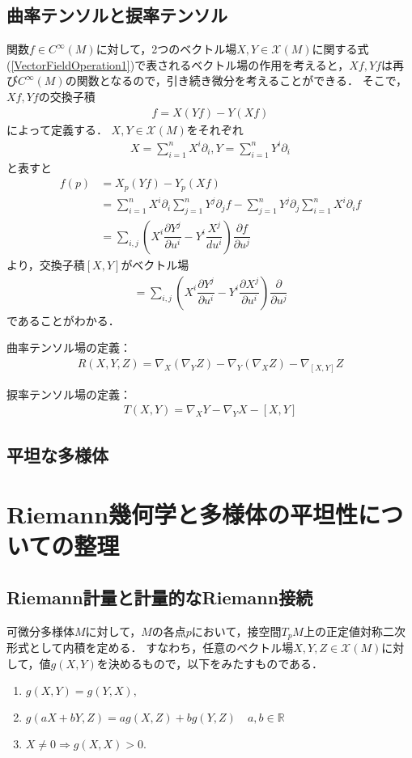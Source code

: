 \documentclass[dvipdfmx, a4paper,10pt]{jsarticle}
\theoremstyle{definition}
\newcommand{\eq}[1]{\begin{align}#1\end{align}}
\newcommand{\enums}[1]{\begin{enumerate}#1\end{enumerate}}
\begin{document}

\subsection{曲率テンソルと捩率テンソル}
関数$f\in C^\infty(M)$に対して，2つのベクトル場$X,Y\in\mathscr{X}(M)$に関する式(\ref{VectorFieldOperation1})で表されるベクトル場の作用を考えると，$Xf,Yf$は再び$C^\infty(M)$の関数となるので，引き続き微分を考えることができる．
そこで，$Xf,Yf$の交換子積
\eq{[X,Y]f=X(Yf)-Y(Xf)}
によって定義する．
$X,Y\in\mathscr{X}(M)$をそれぞれ
\eq{X=\sum_{i=1}^nX^i\partial_i,Y=\sum_{i=1}^nY^i\partial_i}
と表すと
\eq{
	[X,Y]f(p)
		&=X_p(Yf)-Y_p(Xf)\\
		&=\sum_{i=1}^nX^i\partial_i\sum_{j=1}^nY^j\partial_jf-\sum_{j=1}^nY^j\partial_j\sum_{i=1}^nX^i\partial_if\\
		&=\sum_{i,j}\left(X^i\dfrac{\partial Y^j}{\partial u^i}-Y^i\dfrac{X^j}{du^i}\right)\dfrac{\partial f}{\partial u^j}
}
より，交換子積$[X,Y]$がベクトル場
\eq{[X,Y]=\sum_{i,j}\left(X^i\dfrac{\partial Y^j}{\partial u^i}-Y^i\dfrac{\partial X^j}{\partial u^i}\right)\dfrac{\partial}{\partial u^j}}
であることがわかる．

曲率テンソル場の定義：
\eq{R(X,Y,Z)=\nabla_X(\nabla_Y Z)-\nabla_Y(\nabla_X Z)-\nabla_{[X,Y]}Z}

捩率テンソル場の定義：
\eq{T(X,Y)=\nabla_XY-\nabla_YX-[X,Y]}

\subsection{平坦な多様体}
%
%
%
\section{Riemann幾何学と多様体の平坦性についての整理}

%
%
\subsection{Riemann計量と計量的なRiemann接続}
可微分多様体$M$に対して，$M$の各点$p$において，接空間$T_pM$上の正定値対称二次形式として内積を定める．
すなわち，任意のベクトル場$X,Y,Z\in\mathscr{X}(M)$に対して，値$g(X,Y)$を決めるもので，以下をみたすものである．
\enums{
	\item $g(X,Y)=g(Y,X),$
	\item $g(aX+bY,Z)=ag(X,Z)+bg(Y,Z)\quad a,b\in\mathbb{R}$
	\item $X\neq0\Rightarrow g(X,X)>0.$
}
\end{document}
